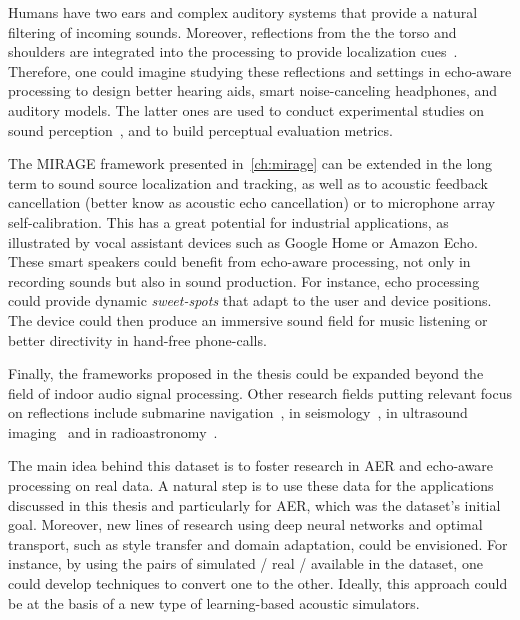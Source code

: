 \mynewline
Humans have two ears and complex auditory systems that provide a natural filtering of incoming sounds.
Moreover, reflections from the the torso and shoulders are integrated into the processing to provide localization cues~.
Therefore, one could imagine studying these reflections and settings in echo-aware processing to design better hearing aids, smart noise-canceling headphones, and auditory models.
The latter ones are used to conduct experimental studies on sound perception~, and to build perceptual evaluation metrics.

\mynewline
The \acs{MIRAGE} framework presented in~\cref{ch:mirage} can be extended in the long term to sound source localization and tracking, as well as to acoustic feedback cancellation (better know as acoustic echo cancellation) or to microphone array self-calibration.
This has a great potential for industrial applications, as illustrated by vocal assistant devices such as Google Home or Amazon Echo.
These smart speakers could benefit from echo-aware processing, not only in recording sounds but also in sound production.
For instance, echo processing could provide dynamic \textit{sweet-spots} that adapt to the user and device positions.
The device could then produce an immersive sound field for music listening or better directivity in hand-free phone-calls.

\mynewline
Finally, the frameworks proposed in the thesis could be expanded beyond the field of indoor audio signal processing.
Other research fields putting relevant focus on reflections include submarine navigation~, in seismology~, in ultrasound imaging~ and in radioastronomy~.


The main idea behind this dataset is to foster research in \ac{AER} and echo-aware processing on real data.
A natural step is to use these data for the applications discussed in this thesis and particularly for \ac{AER}, which was the dataset's initial goal.
Moreover, new lines of research using deep neural networks and optimal transport, such as style transfer and domain adaptation, could be envisioned.
For instance, by using the pairs of simulated \vs/ real \RIRs/ available in the dataset, one could develop techniques to convert one to the other.
Ideally, this approach could be at the basis of a new type of learning-based acoustic simulators.


